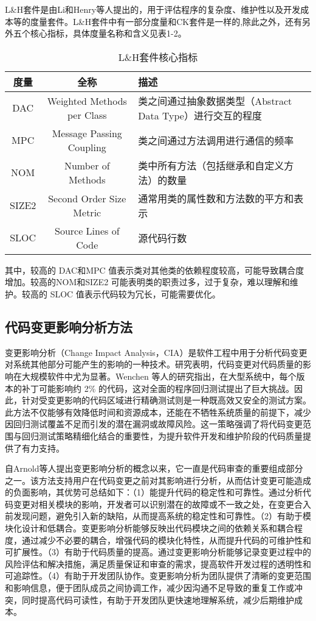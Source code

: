 L\&H套件是由Li和Henry等人提出\cite{1993Object}的，用于评估程序的复杂度、维护性以及开发成本等的度量套件。L&H套件中有一部分度量和CK套件是一样的,除此之外，还有另外五个核心指标，具体度量名称和含义见表1-2。

\begin{table}[htbp]
\caption{L\&H套件核心指标}
\vspace{0.5em}\centering\wuhao
\begin{tabular}{ccp{8cm}}
\toprule
度量 & 全称 & 描述 \\
\midrule
DAC & Weighted Methods per Class & 类之间通过抽象数据类型（Abstract Data Type）进行交互的程度 \\
MPC & Message Passing Coupling & 类之间通过方法调用进行通信的频率 \\
NOM & Number of Methods & 类中所有方法（包括继承和自定义方法）的数量 \\
SIZE2 & Second Order Size Metric & 通常用类的属性数和方法数的平方和表示  \\
SLOC & Source Lines of Code & 源代码行数  \\
\bottomrule
\end{tabular}
\end{table}

其中，较高的 DAC和MPC 值表示类对其他类的依赖程度较高，可能导致耦合度增加。较高的NOM和SIZE2 可能表明类的职责过多，过于复杂，难以理解和维护。较高的 SLOC 值表示代码较为冗长，可能需要优化。


\subsection{代码变更影响分析方法}

变更影响分析（Change Impact Analysis，CIA）是软件工程中用于分析代码变更对系统其他部分可能产生的影响的一种技术。研究表明，代码变更对代码质量的影响在大规模软件中尤为显著。Wenchen 等人的研究指出\cite{2013Large}，在大型系统中，每个版本的补丁可能影响约 2\% 的代码，这对全面的程序回归测试提出了巨大挑战。因此，针对受变更影响的代码区域进行精确测试则是一种既高效又安全的测试方案。此方法不仅能够有效降低时间和资源成本，还能在不牺牲系统质量的前提下，减少因回归测试覆盖不足而引发的潜在漏洞或故障风险。这一策略强调了将代码变更范围与回归测试策略精细化结合的重要性，为提升软件开发和维护阶段的代码质量提供了有力支持。

自Arnold等人\cite{Arnold1996}提出变更影响分析的概念以来，它一直是代码审查的重要组成部分之一。该方法支持用户在代码变更之前对其影响进行分析，从而估计变更可能造成的负面影响，其优势可总结如下：（1）能提升代码的稳定性和可靠性。通过分析代码变更对相关模块的影响，开发者可以识别潜在的故障或不一致之处，在变更合入前发现问题，避免引入新的缺陷，从而提高系统的稳定性和可靠性。（2）有助于模块化设计和低耦合。变更影响分析能够反映出代码模块之间的依赖关系和耦合程度，通过减少不必要的耦合，增强代码的模块化特性，从而提升代码的可维护性和可扩展性。（3）有助于代码质量的提高。通过变更影响分析能够记录变更过程中的风险评估和解决措施，满足质量保证和审查的需求，提高软件开发过程的透明性和可追踪性。（4）有助于开发团队协作。变更影响分析为团队提供了清晰的变更范围和影响信息，便于团队成员之间协调工作，减少因沟通不足导致的重复工作或冲突，同时提高代码可读性，有助于开发团队更快速地理解系统，减少后期维护成本。

